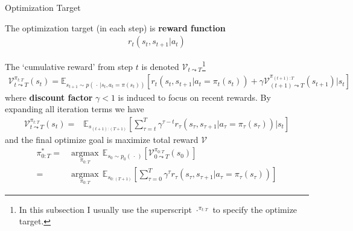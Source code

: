 \begin{point}
    Optimization Target
\end{point}

The optimization target (in each step) is \textbf{reward function} 
\begin{align}
    r_t(s_t,s_{t+1}|a_t)
\end{align}

The `cumulative reward' from step $ t $ is denoted $ \mathcal{V}_{t\leadsto T} $\footnote{In this subsection I usually use the superscript $ \cdot ^{\pi_{t:T}} $ to specify the optimize target.} 
\begin{align}\label{EqaVLearningIteration}
    \mathcal{V}_{t\leadsto T}^{\pi_{t:T}}(s_t)=\mathbb{E}_{s_{t+1}\sim p\left(\, \cdot \, |s_t,a_t=\pi(s_t)\right)}\left[ r_t\left(s_t,s_{t+1}|a_t=\pi_t(s_t)\right)+\gamma \mathcal{V}_{(t+1)\leadsto T}^{\pi_{(t+1):T}} (s_{t+1})\big|s_t\right]
\end{align}
where \textbf{discount factor} $ \gamma<1  $ is induced to focus on recent rewards. By expanding all iteration terms we have
\begin{align}
    \mathcal{V}_{t\leadsto T}^{\pi_{t:T}}(s_t)=&\mathbb{E}_{s_{(t+1):(T+1)}}\left[ \sum_{\tau = t}^T\gamma ^{\tau-t}r_\tau\left(s_\tau,s_{\tau+1}|a_\tau=\pi_\tau(s_\tau)\right)\big|s_t \right]
\end{align}
and the final optimize goal is maximize total reward $ \mathcal{V} $
\begin{align}\label{EqaVLearningTarget}
    \pi_{0:T}^*=&\mathop{\arg\max}\limits_{\pi_{0:T}}\,\mathbb{E}_{s_0\sim p_0(\, \cdot \, )}\left[ \mathcal{V}_{0\leadsto T}^{\pi_{0:T}}(s_0) \right]  \\
    =&\mathop{\arg\max}\limits_{\pi_{0:T}}\,\mathbb{E}_{s_{0:(T+1)}}\left[ \sum_{\tau = 0}^T\gamma ^{\tau}r_\tau\left(s_\tau,s_{\tau+1}|a_\tau=\pi_\tau(s_\tau)\right) \right]
\end{align}



